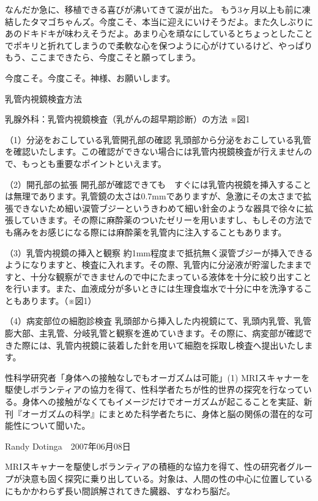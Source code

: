 なんだか急に、移植できる喜びが沸いてきて涙が出た。
もう3ヶ月以上も前に凍結したタマゴちゃんズ。今度こそ、本当に迎えにいけそうだよ。また久しぶりにあのドキドキが味わえそうだよ。あまり心を頑なにしているとちょっとしたことでポキリと折れてしまうので柔軟な心を保つように心がけているけど、やっぱりもう、ここまできたら、今度こそと願ってしまう。

今度こそ。今度こそ。神様、お願いします。






乳管内視鏡検査方法

乳腺外科：乳管内視鏡検査（乳がんの超早期診断）の方法
    ※図1

（1）分泌をおこしている乳管開孔部の確認
乳頭部から分泌をおこしている乳管を確認いたします。この確認ができない場合には乳管内視鏡検査が行えませんので、もっとも重要なポイントといえます。

（2）開孔部の拡張
開孔部が確認できても　すぐには乳管内視鏡を挿入することは無理であります。乳管鏡の太さは0.7mmでありますが、急激にその太さまで拡張できないため細い涙管ブジーというきわめて細い針金のような器具で徐々に拡張していきます。その際に麻酔薬のついたゼリーを用いますし、もしその方法でも痛みをお感じになる際には麻酔薬を乳管内に注入することもあります。

（3）乳管内視鏡の挿入と観察
約1mm程度まで抵抗無く涙管ブジーが挿入できるようになりますと、検査に入れます。その際、乳管内に分泌液が貯溜したままですと、十分な観察ができませんので中にたまっている液体を十分に絞り出すことを行います。また、血液成分が多いときには生理食塩水で十分に中を洗浄することもあります。（※図1）

（4）病変部位の細胞診検査
乳頭部から挿入した内視鏡にて、乳頭内乳管、乳管膨大部、主乳管、分岐乳管と観察を進めていきます。その際に、病変部が確認できた際には、乳管内視鏡に装着した針を用いて細胞を採取し検査へ提出いたします。





性科学研究者「身体への接触なしでもオーガズムは可能」(1)
MRIスキャナーを駆使しボランティアの協力を得て、性科学者たちが性的世界の探究を行なっている。身体への接触がなくてもイメージだけでオーガズムが起こることを実証、新刊『オーガズムの科学』にまとめた科学者たちに、身体と脳の関係の潜在的な可能性について聞いた。

Randy Dotinga　2007年06月08日

MRIスキャナーを駆使しボランティアの積極的な協力を得て、性の研究者グループが決意も固く探究に乗り出している。対象は、人間の性の中心に位置しているにもかかわらず長い間誤解されてきた臓器、すなわち脳だ。

